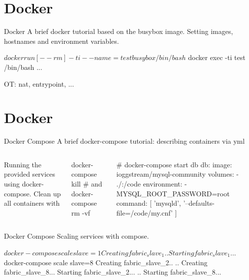 \documentclass{beamer}[10]
\begin{document}
%
%
\section{Docker}
\begin{pyframe}{Docker}
A brief docker tutorial based
on the busybox image.
Setting images, hostnames and environment variables.

\begin{bashcode}
$ docker run [--rm] -ti --name=test busybox /bin/bash
$ docker exec -ti  test /bin/bash
...
\end{bashcode}

OT: nat, entrypoint, ...
\end{pyframe}

\section{Docker}
\begin{pyframe}{Docker Compose}
A brief docker-compose tutorial:
describing containers via yml

\begin{columns}[t]
Running the provided services
using docker-compose.
Clean up all containers with
\begin{bashcode}
docker-compose kill
# and
docker-compose rm -vf
\end{bashcode}
\begin{pycode}
#  docker-compose start db
db:
 image: ioggstream/mysql-community
 volumes:
   - ./:/code
 environment:
   - MYSQL_ROOT_PASSWORD=root
 command: [
   'mysqld',
   '--defaults-file=/code/my.cnf'
 ]
\end{pycode}
\end{columns}

\end{pyframe}


\begin{pyframe}{Docker Compose}
Scaling services with compose.
\begin{bashcode}
$ docker-compose scale slave=1
Creating fabric_slave_1..
Starting fabric_slave_1...

$ docker-compose scale slave=8
Creating fabric_slave_2..
..
Creating fabric_slave_8...
Starting fabric_slave_2...
..
Starting fabric_slave_8...

\end{bashcode}
\\

\end{pyframe}
\end{document}
